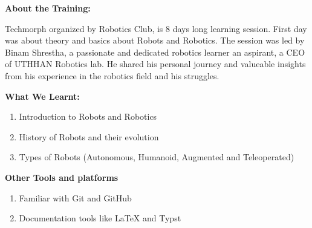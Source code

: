 \documentclass[12pt]{article}
\begin{document}

\vspace{2em}
{\huge \textbf{About the Training:}}
\vspace{1em}

Techmorph organized by Robotics Club, is 8 days long learning session. First day was about theory and basics about Robots and Robotics. The session was led by Binam Shrestha, a passionate and dedicated robotics learner an aspirant, a CEO of UTHHAN Robotics lab.
He shared his personal journey and valueable insights from his experience in the robotics field and his struggles. 

\vspace{2em}
{\huge \textbf{What We Learnt:}}
\vspace{1em}
\begin{enumerate}
    \item Introduction to Robots and Robotics
    \item History of Robots and their evolution
    \item Types of Robots (Autonomous, Humanoid, Augmented and Teleoperated)
\end{enumerate}

\vspace{2em}
{\huge \textbf{Other Tools and platforms }}
\vspace{1em}
\begin{enumerate}
    \item Familiar with Git and GitHub 
    \item Documentation tools like LaTeX and Typst
\end{enumerate}

\end{document}

